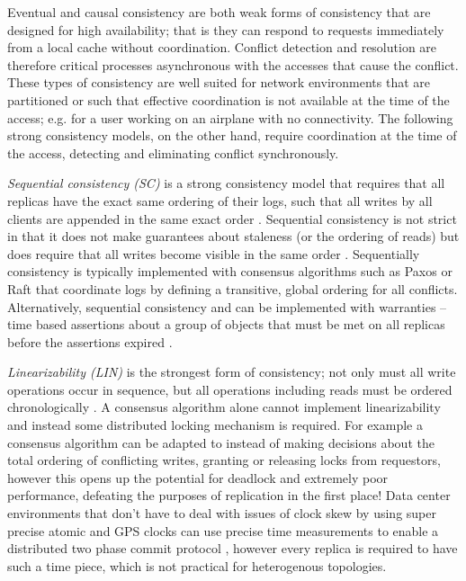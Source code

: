 \documentclass{article}
\begin{document}
Eventual and causal consistency are both weak forms of consistency that are designed for high availability; that is they can respond to requests immediately from a local cache without coordination. Conflict detection and resolution are therefore critical processes asynchronous with the accesses that cause the conflict. These types of consistency are well suited for network environments that are partitioned or such that effective coordination is not available at the time of the access; e.g. for a user working on an airplane with no connectivity. The following strong consistency models, on the other hand, require coordination at the time of the access, detecting and eliminating conflict synchronously.

\textit{Sequential consistency (SC)} is a strong consistency model that requires that all replicas have the exact same ordering of their logs, such that all writes by all clients are appended in the same exact order \cite{attiya_sequential_1994}. Sequential consistency is not strict in that it does not make guarantees about staleness (or the ordering of reads) but does require that all writes become visible in the same order \cite{bermbach_consistency_2013}. Sequentially consistency is typically implemented with consensus algorithms such as Paxos \cite{lamport_fast_2006} or Raft \cite{ongaro_search_2014} that coordinate logs by defining a transitive, global ordering for all conflicts. Alternatively, sequential consistency and can be implemented with warranties -- time based assertions about a group of objects that must be met on all replicas before the assertions expired \cite{liu_warranties_2014}.

\textit{Linearizability (LIN)} is the strongest form of consistency; not only must all write operations occur in sequence, but all operations including reads must be ordered chronologically \cite{herlihy_linearizability:_1990}. A consensus algorithm alone cannot implement linearizability and instead some distributed locking mechanism is required. For example a consensus algorithm can be adapted to instead of making decisions about the total ordering of conflicting writes, granting or releasing locks from requestors, however this opens up the potential for deadlock and extremely poor performance, defeating the purposes of replication in the first place! Data center environments that don't have to deal with issues of clock skew by using super precise atomic and GPS clocks can use precise time measurements to enable a distributed two phase commit protocol \cite{corbett_spanner:_2013}, however every replica is required to have such a time piece, which is not practical for heterogenous topologies.
\end{document}
